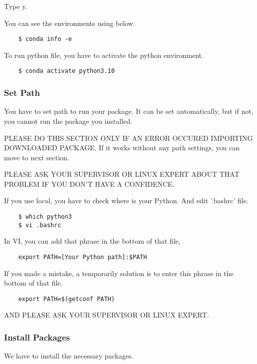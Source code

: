 Type y.

You can see the environments using below.

\begin{verbatim}
    $ conda info -e
\end{verbatim}

To run python file, you have to activate the python environment.

\begin{verbatim}
    $ conda activate python3.10
\end{verbatim}

\subsubsection{Set Path}

You have to set path to run your package. It can be set automatically, but if not, you cannot run the package you installed.

PLEASE DO THIS SECTION ONLY IF AN ERROR OCCURED IMPORTING DOWNLOADED PACKAGE. If it works without any path settings, you can move to next section.

PLEASE ASK YOUR SUPERVISOR OR LINUX EXPERT ABOUT THAT PROBLEM IF YOU DON'T HAVE A CONFIDENCE.

If you use local, you have to check where is your Python. And edit '.bashrc' file.

\begin{verbatim}
    $ which python3
    $ vi .bashrc
\end{verbatim}

In VI, you can add that phrase in the bottom of that file,

\begin{verbatim}
    export PATH=[Your Python path]:$PATH
\end{verbatim}

If you made a mistake, a temporarily solution is to enter this phrase in the bottom of that file.

\begin{verbatim}
    export PATH=$(getconf PATH)
\end{verbatim}

AND PLEASE ASK YOUR SUPERVISOR OR LINUX EXPERT.

\subsubsection{Install Packages}

We have to install the necessary packages.

